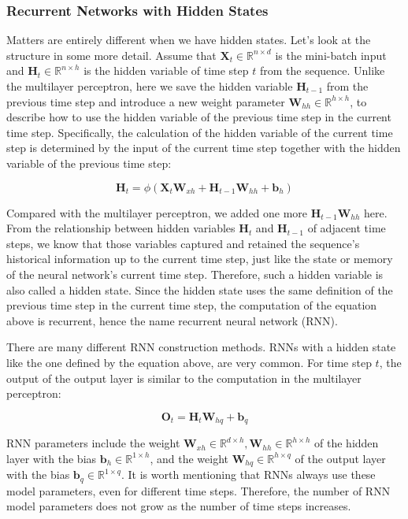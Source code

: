 \subsubsection{Recurrent Networks with Hidden States}\label{subsubsec:rnn_with_hidden_state}

Matters are entirely different when we have hidden states. Let's look at the structure in some more detail. Assume that $\mathbf{X}_t \in \mathbb{R}^{n \times d}$ is the mini-batch input and $\mathbf{H}_t  \in \mathbb{R}^{n \times h}$ is the hidden variable of time step $t$ from the sequence.  Unlike the multilayer perceptron, here we save the hidden variable $\mathbf{H}_{t-1}$ from the previous time step and introduce a new weight parameter $\mathbf{W}_{hh} \in \mathbb{R}^{h \times h}$, to describe how to use the hidden variable of the previous time step in the current time step. Specifically, the calculation of the hidden variable of the current time step is determined by the input of the current time step together with the hidden variable of the previous time step:

$$\mathbf{H}_t = \phi(\mathbf{X}_t \mathbf{W}_{xh} + \mathbf{H}_{t-1} \mathbf{W}_{hh}  + \mathbf{b}_h)$$

Compared with the multilayer perceptron, we added one more $\mathbf{H}_{t-1} \mathbf{W}_{hh}$ here. From the relationship between hidden variables $\mathbf{H}_t$ and $\mathbf{H}_{t-1}$ of adjacent time steps, we know that those variables captured and retained the sequence's historical information up to the current time step, just like the state or memory of the neural network's current time step. Therefore, such a hidden variable is also called a hidden state. Since the hidden state uses the same definition of the previous time step in the current time step, the computation of the equation above is recurrent, hence the name recurrent neural network (RNN).

There are many different RNN construction methods.  RNNs with a hidden state like the one defined by the equation above, are very common. For time step $t$, the output of the output layer is similar to the computation in the multilayer perceptron:

$$\mathbf{O}_t = \mathbf{H}_t \mathbf{W}_{hq} + \mathbf{b}_q$$

RNN parameters include the weight $\mathbf{W}_{xh} \in \mathbb{R}^{d \times h}, \mathbf{W}_{hh} \in \mathbb{R}^{h \times h}$ of the hidden layer with the bias $\mathbf{b}_h \in \mathbb{R}^{1 \times h}$, and the weight $\mathbf{W}_{hq} \in \mathbb{R}^{h \times q}$ of the output layer with the bias $\mathbf{b}_q \in \mathbb{R}^{1 \times q}$. It is worth mentioning that RNNs always use these model parameters, even for different time steps. Therefore, the number of RNN model parameters does not grow as the number of time steps increases.

